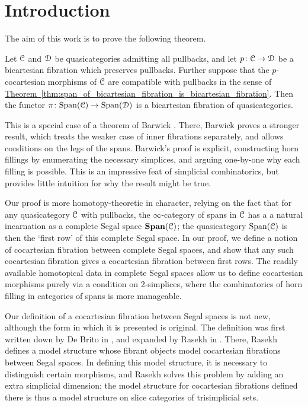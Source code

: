 \documentclass[main.tex]{subfiles}
\begin{document}
\section*{Introduction}
\label{sec:introduction}

The aim of this work is to prove the following theorem.

\begin{theorem*}
  Let $\mathcal{C}$ and $\mathcal{D}$ be quasicategories admitting all pullbacks, and let $p\colon \mathcal{C} \to \mathcal{D}$ be a bicartesian fibration which preserves pullbacks. Further suppose that the $p$-cocartesian morphisms of $\mathcal{C}$ are compatible with pullbacks in the sense of \hyperref[thm:span_of_bicartesian_fibration_is_bicartesian_fibration]{Theorem~\ref*{thm:span_of_bicartesian_fibration_is_bicartesian_fibration}}. Then the functor $\pi\colon \mathrm{Span}(\mathcal{C}) \to \mathrm{Span}(\mathcal{D})$ is a bicartesian fibration of quasicategories.
\end{theorem*}

This is a special case of a theorem of Barwick \cite{spectralmackeyfunctors1}. There, Barwick proves a stronger result, which treats the weaker case of inner fibrations separately, and allows conditions on the legs of the spans. Barwick's proof is explicit, constructing horn fillings by enumerating the necessary simplices, and arguing one-by-one why each filling is possible. This is an impressive feat of simplicial combinatorics, but provides little intuition for why the result might be true.

Our proof is more homotopy-theoretic in character, relying on the fact that for any quasicategory $\mathcal{C}$ with pullbacks, the $\infty$-category of spans in $\mathcal{C}$ has a a natural incarnation as a complete Segal space $\mathbf{Span}(\mathcal{C})$; the quasicategory $\mathrm{Span}(\mathcal{C})$ is then the `first row' of this complete Segal space. In our proof, we define a notion of cocartesian fibration between complete Segal spaces, and show that any such cocartesian fibration gives a cocartesian fibration between first rows. The readily available homotopical data in complete Segal spaces allow us to define cocartesian morphisms purely via a condition on 2-simplices, where the combinatorics of horn filling in categories of spans is more manageable.

Our definition of a cocartesian fibration between Segal spaces is not new, although the form in which it is presented is original. The definition was first written down by De Brito in \cite{2016arXiv160500706B}, and expanded by Rasekh in \cite{rasekhcartesianfibrations}. There, Rasekh defines a model structure whose fibrant objects model cocartesian fibrations between Segal spaces. In defining this model structure, it is necessary to distinguish certain morphisms, and Rasekh solves this problem by adding an extra simplicial dimension; the model structure for cocartesian fibrations defined there is thus a model structure on slice categories of trisimplicial sets.
\end{document}
